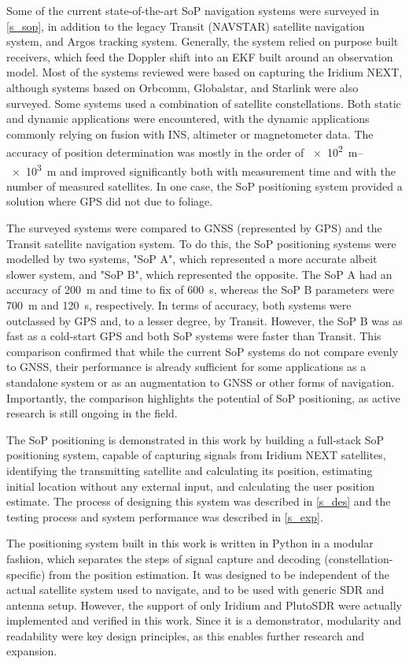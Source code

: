 Some of the current state-of-the-art SoP navigation systems were surveyed in \autoref{s_sop}, in addition to the legacy Transit (NAVSTAR) satellite navigation system, and Argos tracking system. Generally, the system relied on purpose built receivers, which feed the Doppler shift into an EKF built around an observation model. Most of the systems reviewed were based on capturing the Iridium NEXT, although systems based on Orbcomm, Globalstar, and Starlink were also surveyed. Some systems used a combination of satellite constellations. Both static and dynamic applications were encountered, with the dynamic applications commonly relying on fusion with INS, altimeter or magnetometer data. The accuracy of position determination was mostly in the order of \qtyrange{e2}{e3}{\m} and improved significantly both with measurement time and with the number of measured satellites. In one case, the SoP positioning system provided a solution where GPS did not due to foliage. 

The surveyed systems were compared to GNSS (represented by GPS) and the Transit satellite navigation system. To do this, the SoP positioning systems were modelled by two systems, "SoP A", which represented a more accurate albeit slower system, and "SoP B", which represented the opposite. The SoP A had an accuracy of \qty{200}{m} and time to fix of \qty{600}{s}, whereas the SoP B parameters were \qty{700}{m} and \qty{120}{s}, respectively. In terms of accuracy, both systems were outclassed by GPS and, to a lesser degree, by Transit. However, the SoP B was as fast as a cold-start GPS and both SoP systems were faster than Transit. This comparison confirmed that while the current SoP systems do not compare evenly to GNSS, their performance is already sufficient for some applications as a standalone system or as an augmentation to GNSS or other forms of navigation. Importantly, the comparison highlights the potential of SoP positioning, as active research is still ongoing in the field.

The SoP positioning is demonstrated in this work by building a full-stack SoP positioning system, capable of capturing signals from Iridium NEXT satellites, identifying the transmitting satellite and calculating its position, estimating initial location without any external input, and calculating the user position estimate. The process of designing this system was described in \autoref{s_des} and the testing process and system performance was described in \autoref{s_exp}.

The positioning system built in this work is written in Python in a modular fashion, which separates the steps of signal capture and decoding (constellation-specific) from the position estimation. It was designed to be independent of the actual satellite system used to navigate, and to be used with generic SDR and antenna setup. However, the support of only Iridium and PlutoSDR were actually implemented and verified in this work. Since it is a demonstrator, modularity and readability were key design principles, as this enables further research and expansion. 

